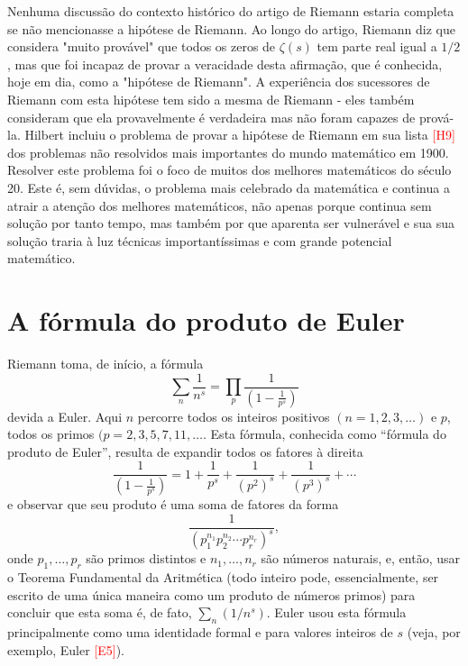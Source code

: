     Nenhuma discussão do contexto histórico do artigo de Riemann estaria 
    completa se não mencionasse a hipótese de Riemann. Ao longo do artigo, 
    Riemann diz que considera "muito provável" que todos os zeros de 
    $\zeta(s)$ tem parte real igual a $1/2$, mas que foi incapaz de 
    provar a veracidade desta afirmação, que é conhecida, hoje em dia, 
    como a "hipótese de Riemann". A experiência dos sucessores de Riemann 
    com esta hipótese tem sido a mesma de Riemann - eles também consideram 
    que ela provavelmente é verdadeira mas não foram capazes de prová-la. 
    Hilbert incluiu o problema de provar a hipótese de Riemann em sua 
    lista \textcolor{red}{[H9]} dos problemas não resolvidos 
    mais importantes do mundo matemático em 1900. 
    Resolver este problema foi o foco de muitos dos melhores 
    matemáticos do século 20. Este é, sem dúvidas, o 
    problema mais celebrado da matemática e continua a atrair 
    a atenção dos melhores matemáticos, não apenas porque 
    continua sem solução por tanto tempo, mas também por 
    que aparenta ser vulnerável e sua sua solução traria à 
    luz técnicas importantíssimas e com grande potencial matemático. 
    
    
    
    \section*{A fórmula do produto de Euler}
    
    
    Riemann toma, de início, a fórmula
    \begin{equation}
        \label{Euler-prod}
        \sum_{n} \frac{1}{n^s} = \prod_{p} \frac{1}{\left( 1 - \frac{1}{p^s}\right)}
    \end{equation}
    devida a Euler. Aqui $n$ percorre todos os inteiros positivos $(n=1,2,3, \dots)$ e $p$, 
    todos os primos $(p=2,3,5,7,11,\dots$. 
    Esta fórmula, conhecida como ``fórmula do produto de Euler'', resulta de expandir todos os fatores à direita
    $$\frac{1}{\left( 1 - \frac{1}{p^s}\right)} = 1 + \frac{1}{p^s} + \frac{1}{(p^2)^s} + \frac{1}{(p^3)^s} + \cdots $$
    e observar que seu produto é uma soma de fatores da forma
    $$\frac{1}{(p_1^{n_1} p_2^{n_2} \cdots p_r^{n_r})^s},$$
    onde $p_1, \dots, p_r$ são primos distintos e $n_1, \dots, n_r$ são números naturais, e, então, usar o Teorema Fundamental da Aritmética (todo inteiro pode, essencialmente, ser escrito de uma única maneira como um produto de números primos) para concluir que esta soma é, de fato, $\sum_{n}(1/n^s)$. Euler usou esta fórmula principalmente como uma identidade formal e para valores inteiros de $s$ (veja, por exemplo, Euler \textcolor{red}{[E5]}).
    
